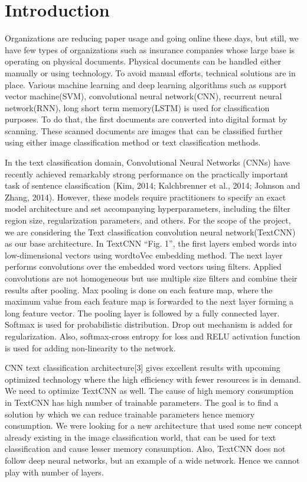 \documentclass[conference]{IEEEtran}
\begin{document}
\section{Introduction}
Organizations are reducing paper usage and going online these days, but still, we have few types of organizations such as insurance companies whose large base is operating on physical documents. Physical documents can be handled either manually or using technology. To avoid manual efforts, technical solutions are in place. 
Various machine learning and deep learning algorithms such as support vector machine(SVM), convolutional neural network(CNN), recurrent neural network(RNN), long short term memory(LSTM) is used for classification purposes. To do that, the first documents are converted into digital format by scanning. These scanned documents are images that can be classified further using either image classification method or text classification methods. 

In the text classification domain, Convolutional Neural Networks (CNNs) have recently achieved remarkably strong performance on the practically important task of sentence classification (Kim, 2014; Kalchbrenner et al., 2014; Johnson and Zhang, 2014). However, these models require practitioners to specify an exact model architecture and set accompanying hyperparameters, including the filter region size, regularization parameters, and others. For the scope of the project, we are considering the Text classification convolution neural network(TextCNN) as our base architecture. In TextCNN “Fig. 1”, the first layers embed words into low-dimensional vectors using wordtoVec embedding method. The next layer performs convolutions over the embedded word vectors using filters. Applied convolutions are not homogeneous but use multiple size filters and combine their results after pooling. Max pooling is done on each feature map, where the maximum value from each feature map is forwarded to the next layer forming a long feature vector.  The pooling layer is followed by a fully connected layer. Softmax is used for probabilistic distribution. Drop out mechanism is added for regularization. Also, softmax-cross entropy for loss and RELU activation function is used for adding non-linearity to the network.

CNN text classification architecture[3] gives excellent results with upcoming optimized technology where the high efficiency with fewer resources is in demand. We need to optimize TextCNN as well. The cause of high memory consumption in TextCNN has high number of trainable parameters. The goal is to find a solution by which we can reduce trainable parameters hence memory consumption. We were looking for a new architecture that used some new concept already existing in the image classification world, that can be used for text classification and cause lesser memory consumption. Also, TextCNN does not follow deep neural networks, but an example of a wide network. Hence we cannot play with number of layers.
\end{document}
